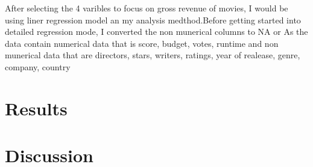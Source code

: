 \documentclass[12pt]{article}
\begin{document}
After selecting the 4 varibles to focus on gross revenue of movies, I would be using
liner regression model an my analysis medthod.Before getting started into detailed 
regression mode, I converted the non munerical columns to NA or  As the data contain
numerical data that is score, budget, votes, runtime and non munerical data that are 
directors, stars, writers, ratings, year of realease, genre, company, country 

\section{Results}
\label{sec:resu}



\section{Discussion}
\label{sec:disc}





\end{document}
